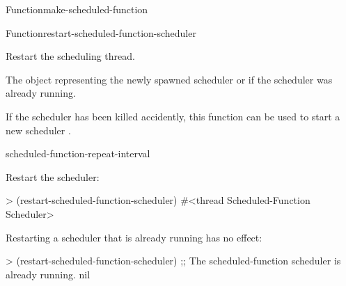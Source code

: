 \begin{functiondoc}{Function}{make-scheduled-function}{ 
     
    \returns{} }
\end{functiondoc}


\begin{functiondoc}{Function}{restart-scheduled-function-scheduler}%
  {\noargs{} \returns{} }
%

\fnsyntax

\fnpurpose Restart the  scheduling thread.

\fnpackage {}

\fnmodule {}

\fnreturns The object representing the newly spawned
 scheduler  or \nil{} if the
 scheduler was already running.

\fnerrors
\nothreads{}

\fndescription If the  scheduler  has
been killed accidently, this function can be used to start a new scheduler
.

\begin{alsos}{scheduled-function-repeat-interval}
\end{alsos}

\fnexamples
Restart the  scheduler:
\begin{example}
> (restart-scheduled-function-scheduler)
#<thread Scheduled-Function Scheduler>
\end{example}

Restarting a  scheduler that is already running has
no effect:
\begin{example}
> (restart-scheduled-function-scheduler)
;; The scheduled-function scheduler is already running.
nil
\end{example}

\end{functiondoc}


